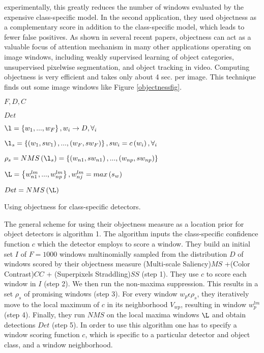 experimentally, this greatly reduces the number of windows evaluated by the expensive class-specific model. In the second application,
they used objectness as a complementary score in addition to the class-specific model, which leads to fewer false positives. As shown in
several recent papers, objectness can act as a valuable focus of attention mechanism in many other applications operating on image
windows, including weakly supervised learning of object categories, unsupervised pixelwise segmentation, and object tracking in video.
Computing objectness is very efficient and takes only about 4 sec. per image. This technique finds out some image windows like Figure \ref{objectnessfig}. \hfill \break

\begin{algorithm}[H]
\SetAlgoLined
\begin{description}\itemsep1pt \parskip0pt  \vspace{.5cm}
  \item[Input:] \(F, D, C\) 
  \item[Ouput:] \(Det\)
  \item[Step 1:] \( \l = \left \{ w_{1},...,w_{F} \right \}, w_{i}\rightarrow D, \forall_{i} \)
  \item[Step 2:] \( \l_{s} = \left \{ \left ( w_{1},sw_{1} \right ),...,\left ( w_{F},sw_{F} \right )  \right \}, sw_{i}= c\left ( w_{i} \right ), \forall_{i} \) 
  \item[Step 3:] \( \rho _{s} = NMS\left ( \l_{s} \right )=\left \{ \left ( w_{n1},sw_{n1} \right ),...,\left ( w_{np},sw_{np} \right )  \right \}\)
  \item[Step 4:] \(\L=\left \{ w_{n1}^{lm},..., w_{np}^{lm} \right \}, w_{nj}^{lm} = max \left ( s_{w} \right )\)
  \item[Step 5:] \(Det = NMS\left ( \L \right )\)
\end{description}
\caption{Using objectness for class-specific detectors.}
\end{algorithm}

\hfill \break
The general scheme for using their objectness measure as
a location prior for object detectors is algorithm 1. The
algorithm inputs the class-specific confidence function \(c\) which
the detector employs to score a window.
They build an initial set \(I\) of \(F = 1000\) windows multinomially sampled from the distribution \(D\) of windows scored by
their objectness measure (Multi-scale Saliency)\(MS\) +(Color Contrast)\(CC\) + (Superpixels Straddling)\(SS\) (step 1). They use \(c\) to
score each window in \(I\) (step 2). We then run the non-maxima
suppression. This results in a set \(\rho_{s}\) of promising
windows (step 3). For every window \(w_{p} \epsilon \rho_{s}\), they iteratively
move to the local maximum of \(c\) in its neighborhood \(V_{w
p}\),
resulting in window \(w_{p}^{lm}\) (step 4). Finally, they run \(NMS\) on the
local maxima windows \(\L\) and obtain detections \(Det\) (step 5).
In order to use this algorithm one has to specify a window
scoring function \(c\), which is specific to a particular detector
and object class, and a window neighborhood.



